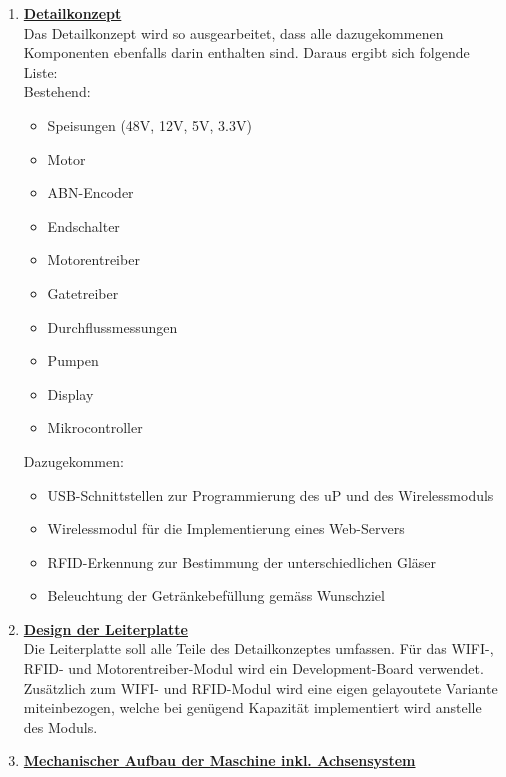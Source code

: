 \begin{enumerate}

\item \underline{\textbf{Detailkonzept}}\mbox{}\\

Das Detailkonzept wird so ausgearbeitet, dass alle dazugekommenen Komponenten ebenfalls darin enthalten sind. Daraus ergibt sich folgende Liste:\\

Bestehend:
\begin{itemize}
\item Speisungen (48V, 12V, 5V, 3.3V)
\item Motor
\item ABN-Encoder
\item Endschalter
\item Motorentreiber
\item Gatetreiber
\item Durchflussmessungen
\item Pumpen
\item Display
\item Mikrocontroller\\
\end{itemize}

Dazugekommen:

\begin{itemize}
\item USB-Schnittstellen zur Programmierung des uP und des Wirelessmoduls 
\item Wirelessmodul für die Implementierung eines Web-Servers
\item RFID-Erkennung zur Bestimmung der unterschiedlichen Gläser
\item Beleuchtung der Getränkebefüllung gemäss Wunschziel\\
\end{itemize}

\item \underline{\textbf{Design der Leiterplatte}}\mbox{}\\

Die Leiterplatte soll alle Teile des Detailkonzeptes umfassen. Für das WIFI-, RFID- und Motorentreiber-Modul wird ein Development-Board verwendet. Zusätzlich zum WIFI- und RFID-Modul wird eine eigen gelayoutete Variante miteinbezogen, welche bei genügend Kapazität implementiert wird anstelle des Moduls.\\

\item \underline{\textbf{Mechanischer Aufbau der Maschine inkl. Achsensystem}}\mbox{}\\


\end{enumerate}
